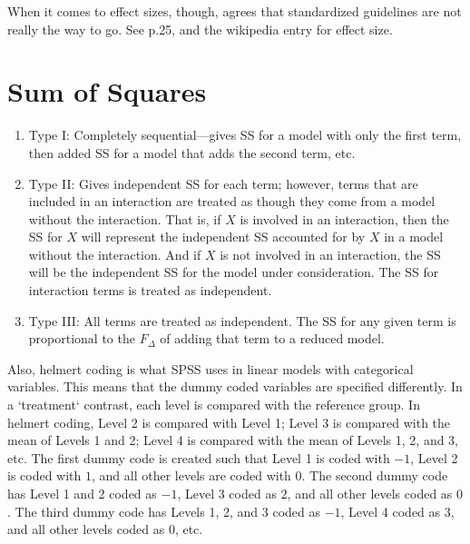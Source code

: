 When it comes to effect sizes, though, \cite{cohen1988power} agrees that standardized guidelines are not really the way to go. See p.25, and the wikipedia entry for effect size.

\chapter{Sum of Squares}
\label{app:L}
\begin{enumerate}
    \item Type I: Completely sequential---gives SS for a model with only the first term, then added SS for a model that adds the second term, etc.
    \item Type II: Gives independent SS for each term; however, terms that are included in an interaction are treated as though they come from a model without the interaction. That is, if $X$ is involved in an interaction, then the SS for $X$ will represent the independent SS accounted for by $X$ in a model without the interaction. And if $X$ is not involved in an interaction, the SS will be the independent SS for the model under consideration. The SS for interaction terms is treated as independent.
    \item Type III: All terms are treated as independent. The SS for any given term is proportional to the $F_{\Delta}$ of adding that term to a reduced model.
\end{enumerate}

Also, helmert coding is what SPSS uses in linear models with categorical variables. This means that the dummy coded variables are specified differently. In a `treatment` contrast, each level is compared with the reference group. In helmert coding, Level 2 is compared with Level 1; Level 3 is compared with the mean of Levels 1 and 2; Level 4 is compared with the mean of Levels 1, 2, and 3, etc. The first dummy code is created such that Level 1 is coded with $-1$, Level 2 is coded with $1$, and all other levels are coded with $0$. The second dummy code has Level 1 and 2 coded as $-1$, Level 3 coded as $2$, and all other levels coded as $0$. The third dummy code has Levels 1, 2, and 3 coded as $-1$, Level 4 coded as $3$, and all other levels coded as $0$, etc.

